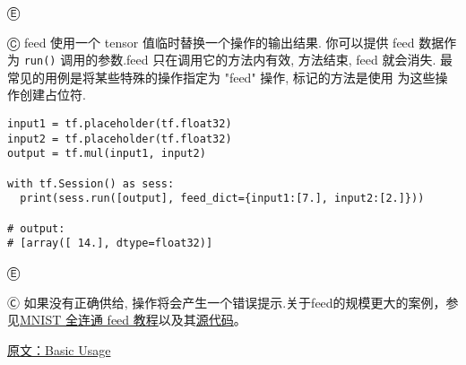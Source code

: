 Ⓔ 

Ⓒ feed 使用一个 tensor 值临时替换一个操作的输出结果. 你可以提供 feed 数据作为 \lstinline {run()} 调用的参数.feed 只在调用它的方法内有效, 方法结束, feed 就会消失. 最常见的用例是将某些特殊的操作指定为 "feed" 操作, 标记的方法是使用 为这些操作创建占位符.

\begin{lstlisting}
input1 = tf.placeholder(tf.float32)
input2 = tf.placeholder(tf.float32)
output = tf.mul(input1, input2)

with tf.Session() as sess:
  print(sess.run([output], feed_dict={input1:[7.], input2:[2.]}))

# output:
# [array([ 14.], dtype=float32)]
\end{lstlisting}

Ⓔ 

Ⓒ 如果没有正确供给,   操作将会产生一个错误提示.关于feed的规模更大的案例，参见\hyperref[minist_tf]{MNIST 全连通 feed 教程}以及其\href{https://tensorflow.googlesource.com/tensorflow/+/master/tensorflow/g3doc/tutorials/mnist/fully_connected_feed.py}{源代码}。

\href{http://tensorflow.org/get_started/basic_usage.md}{原文：Basic Usage}